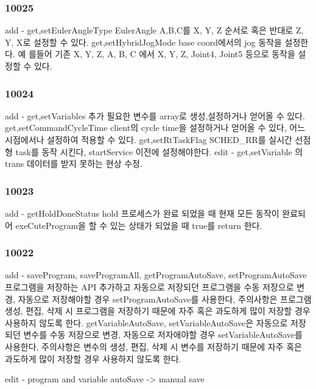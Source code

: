\subsubsection*{10025 }

\begin{DoxyVerb}     add  - get,setEulerAngleType EulerAngle A,B,C를 X, Y, Z 순서로 혹은 반대로 Z, Y, X로 설정할 수 있다.
            get,setHybridJogMode base coord에서의 jog 동작을 설정한다. 예 를들어 기존 X, Y, Z, A, B, C 에서
            X, Y, Z, Joint4, Joint5 등으로 동작을 설정할 수 있다.
\end{DoxyVerb}


\subsubsection*{10024 }

\begin{DoxyVerb}     add  - get,setVariables 추가 필요한 변수를 array로 생성,설정하거나 얻어올 수 있다.
            get,setCommandCycleTime client의 cycle time을 설정하거나 얻어올 수 있다, 어느 시점에서나 설정하여 적용할 수 있다.
            get,setRtTaskFlag SCHED_RR를 실시간 선점형 task를 동작 시킨다, startService 이전에 설정해야한다.
     edit - get,setVariable 의 trans 데이터를 받지 못하는 현상 수정.
\end{DoxyVerb}


\subsubsection*{10023 }

\begin{DoxyVerb}     add  - getHoldDoneStatus hold 프로세스가 완료 되었을 때 현재 모든 동작이 완료되어 exeCuteProgram을 할 수 있는 상태가
            되었을 때 true를 return 한다.
\end{DoxyVerb}


\subsubsection*{10022 }

\begin{DoxyVerb}     add  - saveProgram, saveProgramAll, getProgramAutoSave, setProgramAutoSave 프로그램을 저장하는 API 추가하고
            자동으로 저장되던 프로그램을 수동 저장으로 변경, 자동으로 저장해야할 경우 setProgramAutoSave를 사용한다, 주의사항은
            프로그램 생성, 편집, 삭제 시 프로그램을 저장하기 때문에 자주 혹은 과도하게 많이 저장할 경우 사용하지 않도록 한다.
            getVariableAutoSave, setVariableAutoSave은
            자동으로 저장되던 변수를 수동 저장으로 변경, 자동으로 저자애야할 경우 setVariableAutoSave를 사용한다, 주의사항은
            변수의 생성, 편집, 삭제 시 변수를 저장하기 때문에 자주 혹은 과도하게 많이 저장할 경우 사용하지 않도록 한다.

     edit - program and variable autoSave -> manual save
\end{DoxyVerb}


